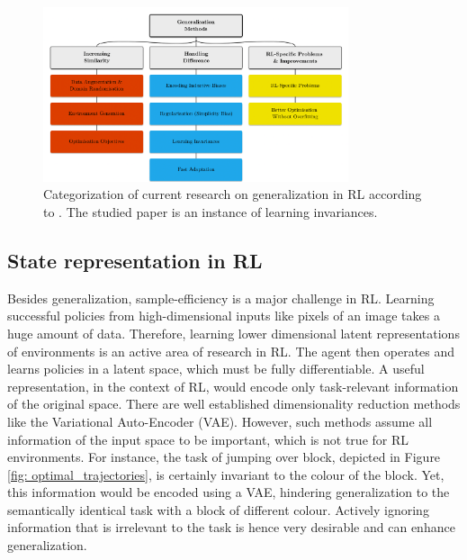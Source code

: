 \documentclass{usiinftr}
\begin{document}
\begin{figure} 
\centering
\includegraphics[width = 0.8\textwidth]{figures/Overview_research.png}
\caption{\label{fig: overview_research} Categorization of current research on generalization in RL according to \cite{kirk2021survey}. The studied paper \cite{agarwal2021contrastive} is an instance of learning invariances. }
\end{figure}

\subsection{State representation in RL} \label{sec: state repr}
Besides generalization, sample-efficiency is a major challenge in RL.
Learning successful policies from high-dimensional inputs like pixels of an image takes a huge amount of data.
Therefore, learning lower dimensional latent representations of environments is an active area of research in RL.
The agent then operates and learns policies in a latent space, which must be fully differentiable. \cite{hadeep}
A useful representation, in the context of RL, would encode only task-relevant information of the original space.
There are well established dimensionality reduction methods like the Variational Auto-Encoder (VAE).
However, such methods assume all information of the input space to be important, which is not true for RL environments.
For instance, the task of jumping over block, depicted in Figure \ref{fig: optimal_trajectories}, is certainly invariant to the colour of the block.
Yet, this information would be encoded using a VAE, hindering generalization to the semantically identical task with a block of different colour.
Actively ignoring information that is irrelevant to the task is hence very desirable and can enhance generalization.
\cite{hadeep} \cite{kirk2021survey}
\end{document}
